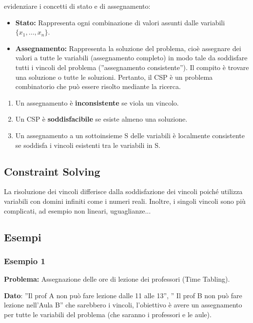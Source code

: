 evidenziare i concetti di stato e di assegnamento:
\begin{itemize}
    \item \textbf{Stato:} Rappresenta ogni combinazione di valori assunti dalle
          variabili $\{x_1, \ldots, x_n\}$.
    \item \textbf{Assegnamento:} Rappresenta la soluzione del problema, cioè
          assegnare dei valori a tutte le variabili (assegnamento completo) in modo
          tale da soddisfare tutti i vincoli del problema (”assegnamento
          consistente”). Il compito è trovare una soluzione o tutte le soluzioni.
          Pertanto, il CSP è un problema combinatorio che può essere risolto mediante
          la ricerca.
\end{itemize}
\begin{enumerate}
    \item Un assegnamento è \textbf{inconsistente} se viola un vincolo.
    \item Un CSP è \textbf{soddisfacibile} se esiste almeno una soluzione.
    \item Un assegnamento a un sottoinsieme S delle variabili è localmente
          consistente se soddisfa i vincoli esistenti tra le variabili in S.
\end{enumerate}

\subsection{Constraint Solving}
La risoluzione dei vincoli differisce dalla soddisfazione dei vincoli poiché
utilizza variabili con domini infiniti come i numeri reali. Inoltre, i singoli
vincoli sono più complicati, ad esempio non lineari, uguaglianze...
\subsection{Esempi}
\subsubsection{Esempio 1}
\textbf{Problema:} Assegnazione delle ore di lezione dei professori (Time
Tabling).

\vspace{0.2cm}

\noindent \textbf{Dato}: ”Il prof A non può fare lezione dalle 11 alle 13”, ” Il
prof B non può fare lezione nell'Aula B” che sarebbero i vincoli, l'obiettivo è
avere un assegnamento per tutte le variabili del problema (che saranno i
professori e le aule).
\vspace{0.2cm}

